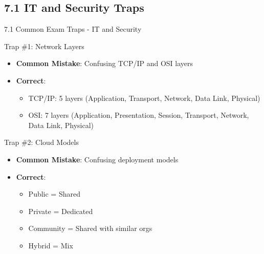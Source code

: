 \documentclass{beamer}
\begin{document}
	\subsection{7.1 IT and Security Traps}
	\begin{frame}{7.1 Common Exam Traps - IT and Security}
		\begin{block}{Trap \#1: Network Layers}
			\begin{itemize}
				\item \textbf{Common Mistake}: Confusing TCP/IP and OSI layers
				\item \textbf{Correct}:
				\begin{itemize}
					\item TCP/IP: 5 layers (Application, Transport, Network, Data Link, Physical)
					\item OSI: 7 layers (Application, Presentation, Session, Transport, Network, Data Link, Physical)
				\end{itemize}
			\end{itemize}
		\end{block}
		
		\begin{block}{Trap \#2: Cloud Models}
			\begin{itemize}
				\item \textbf{Common Mistake}: Confusing deployment models
				\item \textbf{Correct}:
				\begin{itemize}
					\item Public = Shared
					\item Private = Dedicated
					\item Community = Shared with similar orgs
					\item Hybrid = Mix
				\end{itemize}
			\end{itemize}
		\end{block}
	\end{frame}
	
\end{document}
